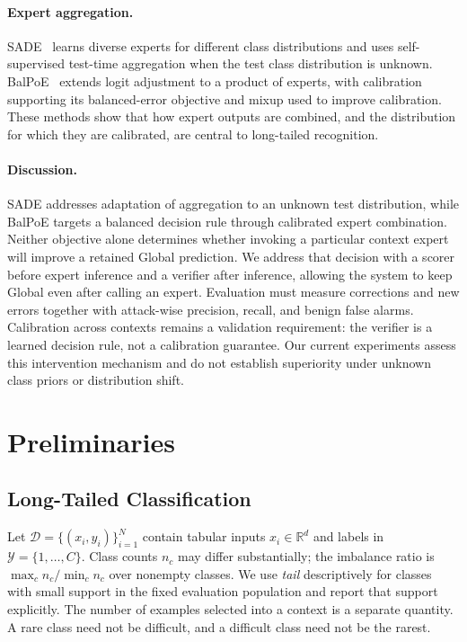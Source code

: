 \documentclass[sigconf,anonymous,pbalance]{acmart}
\begin{document}
\paragraph{Expert aggregation.}
SADE~\cite{Zhang_2022} learns diverse experts for different class distributions and uses self-supervised test-time aggregation when the test class distribution is unknown. BalPoE~\cite{Aimar_2023_CVPR} extends logit adjustment to a product of experts, with calibration supporting its balanced-error objective and mixup used to improve calibration. These methods show that how expert outputs are combined, and the distribution for which they are calibrated, are central to long-tailed recognition.

\paragraph{Discussion.}
SADE addresses adaptation of aggregation to an unknown test distribution, while BalPoE targets a balanced decision rule through calibrated expert combination. Neither objective alone determines whether invoking a particular context expert will improve a retained Global prediction. We address that decision with a scorer before expert inference and a verifier after inference, allowing the system to keep Global even after calling an expert. Evaluation must measure corrections and new errors together with attack-wise precision, recall, and benign false alarms. Calibration across contexts remains a validation requirement: the verifier is a learned decision rule, not a calibration guarantee. Our current experiments assess this intervention mechanism and do not establish superiority under unknown class priors or distribution shift.

\section{Preliminaries}
\label{sec:prelim}
\subsection{Long-Tailed Classification}
Let $\mathcal{D}=\{(x_i,y_i)\}_{i=1}^{N}$ contain tabular inputs $x_i\in\mathbb{R}^{d}$ and labels in $\mathcal{Y}=\{1,\ldots,C\}$. Class counts $n_c$ may differ substantially; the imbalance ratio is $\max_c n_c/\min_c n_c$ over nonempty classes. We use \emph{tail} descriptively for classes with small support in the fixed evaluation population and report that support explicitly. The number of examples selected into a context is a separate quantity. A rare class need not be difficult, and a difficult class need not be the rarest.
\end{document}

